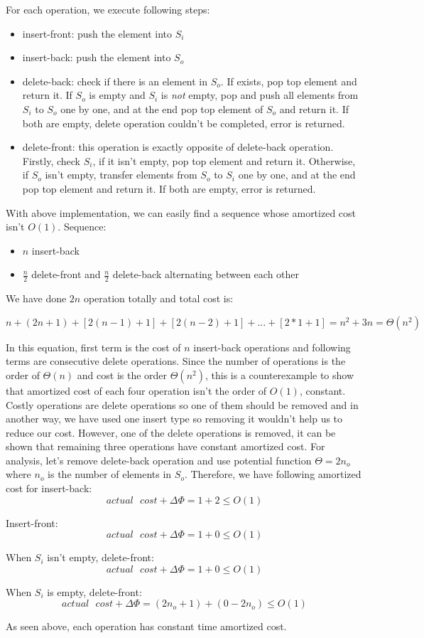 \clearpage
For each operation, we execute following steps:
\begin{itemize}
\item insert-front: push the element into $S_{i}$
\item insert-back: push the element into $S_{o}$
\item delete-back: check if there is an element in $S_{o}$. If exists, pop top element and return it. If $S_{o}$ is empty and $S_{i}$ is \textit{not} empty, pop and push all elements from $S_{i}$ to $S_{o}$ one by one, and at the end pop top element of $S_{o}$ and return it. If both are empty, delete operation couldn't be completed, error is returned.
\item delete-front: this operation is exactly opposite of delete-back operation. Firstly, check $S_{i}$, if it isn't empty, pop top element and return it. Otherwise, if $S_{o}$ isn't empty, transfer elements from $S_{o}$ to $S_{i}$ one by one, and at the end pop top element and return it. If both are empty, error is returned.
\end{itemize}

With above implementation, we can easily find a sequence whose amortized cost isn't $O(1)$. Sequence:

\begin{itemize}
\item $n$ insert-back
\item $\frac{n}{2}$ delete-front and $\frac{n}{2}$ delete-back alternating between each other
\end{itemize} 

We have done $2n$ operation totally and total cost is:

$$
n + (2n + 1) + [2(n-1) + 1] + [2(n-2) + 1] + \dots + [2*1 + 1] = n^{2} + 3n = \Theta(n^{2})
$$

In this equation, first term is the cost of $n$ insert-back operations and following terms are consecutive delete operations. Since the number of operations is the order of $\Theta(n)$ and cost is the order $\Theta(n^{2})$, this is a counterexample to show that amortized cost of each four operation isn't the order of $O(1)$, constant. Costly operations are delete operations so one of them should be removed and in another way, we have used one insert type so removing it wouldn't help us to reduce our cost. However, one of the delete operations is removed, it can be shown that remaining three operations have constant amortized cost. For analysis, let's remove delete-back operation and use potential function $\Theta = 2n_{o}$ where $n_{o}$ is the number of elements in $S_{o}$. Therefore, we have following amortized cost for insert-back:
$$
actual\text{ }cost + \Delta\Phi = 1 + 2 \leq O(1)
$$

Insert-front:
$$
actual\text{ }cost + \Delta\Phi = 1 + 0 \leq O(1)
$$

When $S_{i}$ isn't empty, delete-front:
$$
actual\text{ }cost + \Delta\Phi = 1 + 0 \leq O(1)
$$

When $S_{i}$ is empty, delete-front:
$$
actual\text{ }cost + \Delta\Phi = (2n_{o} + 1) + (0 - 2n_{o}) \leq O(1)
$$

As seen above, each operation has constant time amortized cost.